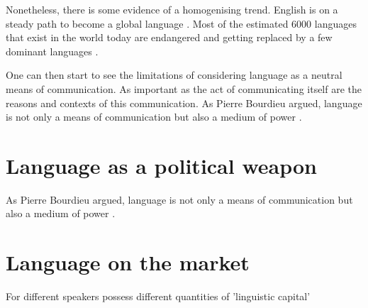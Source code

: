 \documentclass[../thesis.tex]{subfiles}
\begin{document}
Nonetheless, there is some evidence of a homogenising trend. English is on a steady path to become a global language \cite{CrystalEnglishGlobal2010}. Most of the estimated \SI{6000}{} languages that exist in the world today are endangered \cite{CrystalLanguageDeath2000,GrenobleEndangeredLanguages1998,KraussWorldLanguages1992} and getting replaced by a few dominant languages \cite{GrilloDominantLanguages1989,WardhaughLanguagesCompetition1987}.



One can then start to see the limitations of considering language as a neutral means of communication. As important as the act of communicating itself are the reasons and contexts of this communication. As Pierre Bourdieu argued, language is not only a means of communication but also a medium of power \cite{BourdieuLanguageSymbolic2009}. 




\section{Language as a political weapon}
As Pierre Bourdieu argued, language is not only a means of communication but also a medium of power \cite{BourdieuLanguageSymbolic2009}. 

\section{Language on the market} %
For different speakers possess different quantities of 'linguistic capital' \cite{BourdieuLanguageSymbolic2009}
\end{document}
